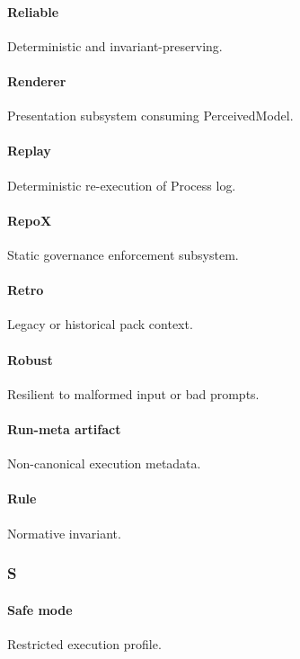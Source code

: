 \documentclass[9pt,a4paper,openany]{book}
\begin{document}
\paragraph{Reliable}
Deterministic and invariant-\allowbreak{}preserving.\allowbreak{}


\paragraph{Renderer}
Presentation subsystem consuming PerceivedModel.\allowbreak{}


\paragraph{Replay}
Deterministic re-\allowbreak{}execution of Process log.\allowbreak{}


\paragraph{RepoX}
Static governance enforcement subsystem.\allowbreak{}


\paragraph{Retro}
Legacy or historical pack context.\allowbreak{}


\paragraph{Robust}
Resilient to malformed input or bad prompts.\allowbreak{}


\paragraph{Run-meta artifact}
Non-\allowbreak{}canonical execution metadata.\allowbreak{}


\paragraph{Rule}
Normative invariant.\allowbreak{}


\subsubsection{S}

\paragraph{Safe mode}
Restricted execution profile.\allowbreak{}
\end{document}
